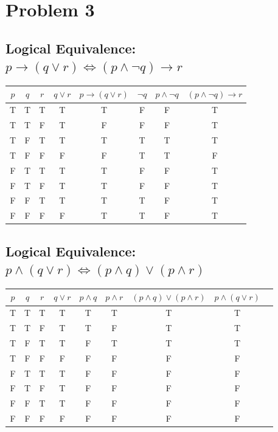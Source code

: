 \documentclass[a4paper, 10pt]{article}
\begin{document}
    \section{Problem 3}
        \subsection{Logical Equivalence: \( p \rightarrow (q \lor r) \Leftrightarrow (p \land \neg q) \rightarrow r \)}
            \begin{tabular}{|c|c|c|c|c|c|c|c|}
                \hline
                $p$ & $q$ & $r$ & $q \lor r$ & $p \rightarrow (q \lor r)$ & $\neg q$ & $p \land \neg q$ & $(p \land \neg q) \rightarrow r$ \\ \hline
                T & T & T & T & T & F & F & T \\ \hline
                T & T & F & T & F & F & F & T \\ \hline
                T & F & T & T & T & T & T & T \\ \hline
                T & F & F & F & F & T & T & F \\ \hline
                F & T & T & T & T & F & F & T \\ \hline
                F & T & F & T & T & F & F & T \\ \hline
                F & F & T & T & T & T & F & T \\ \hline
                F & F & F & F & T & T & F & T \\ \hline
            \end{tabular}

        \subsection{Logical Equivalence: \( p \land (q \lor r) \Leftrightarrow (p \land q) \lor (p \land r) \)}
            \begin{tabular}{|c|c|c|c|c|c|c|c|c|}
                \hline
                $p$ & $q$ & $r$ & $q \lor r$ & $p \land q$ & $p \land r$ & $(p \land q) \lor (p \land r)$ & $p \land (q \lor r)$ \\ \hline
                T & T & T & T & T & T & T & T \\ \hline
                T & T & F & T & T & F & T & T \\ \hline
                T & F & T & T & F & T & T & T \\ \hline
                T & F & F & F & F & F & F & F \\ \hline
                F & T & T & T & F & F & F & F \\ \hline
                F & T & F & T & F & F & F & F \\ \hline
                F & F & T & T & F & F & F & F \\ \hline
                F & F & F & F & F & F & F & F \\ \hline
            \end{tabular}
\end{document}
